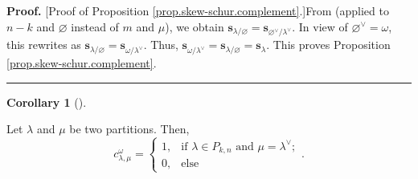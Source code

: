 \documentclass[numbers=enddot,12pt,final,onecolumn,notitlepage]{scrartcl}%
\theoremstyle{definition}
\newtheorem{coro}[theo]{Corollary}
\newenvironment{corollary}[1][]
{\begin{coro}[#1]\begin{leftbar}}
{\end{leftbar}\end{coro}}
\newenvironment{proof}[1][Proof]{\noindent\textbf{#1.} }{\ \rule{0.5em}{0.5em}}
\begin{document}
\begin{proof}
[Proof of Proposition \ref{prop.skew-schur.complement}.]From \cite[Exercise
2.9.15(a)]{GriRei18} (applied to $n-k$ and $\varnothing$ instead of $m$ and
$\mu$), we obtain $\mathbf{s}_{\lambda/\varnothing}=\mathbf{s}_{\varnothing
^{\vee}/\lambda^{\vee}}$. In view of $\varnothing^{\vee}=\omega$, this
rewrites as $\mathbf{s}_{\lambda/\varnothing}=\mathbf{s}_{\omega/\lambda
^{\vee}}$. Thus, $\mathbf{s}_{\omega/\lambda^{\vee}}=\mathbf{s}_{\lambda
/\varnothing}=\mathbf{s}_{\lambda}$. This proves Proposition
\ref{prop.skew-schur.complement}.
\end{proof}

\begin{corollary}
\label{cor.LRcoeffs.omega}Let $\lambda$ and $\mu$ be two partitions. Then,%
\[
c_{\lambda,\mu}^{\omega}=%
\begin{cases}
1, & \text{if }\lambda\in P_{k,n}\text{ and }\mu=\lambda^{\vee};\\
0, & \text{else}%
\end{cases}
.
\]

\end{corollary}
\end{document}
